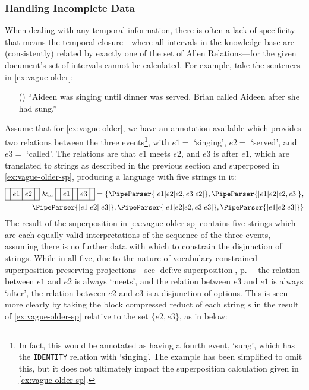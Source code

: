 \documentclass[a4paper,12pt,leqno,twoside]{article}
\newcommand{\vph}[1]{\vphantom{#1}}
\newcommand{\ebox}[1]{\fbox{$\vph{'(),}#1$}}
\newcommand{\nbBefore}[2]{\ebox{#1}\ebox{}\ebox{#2}}
\newcommand{\nbMeets}[2]{\ebox{#1}\ebox{#2}}
\newcommand{\nbAfter}[2]{\nbBefore{#2}{#1}}
\newcommand{\Meets}[2]{\ebox{}\nbMeets{#1}{#2}\ebox{}}
\newcommand{\After}[2]{\ebox{}\nbAfter{#1}{#2}\ebox{}}
\newcommand{\spvc}{~\&_{v\!c}~}
\newcommand{\EventString}[1]{%
	\renewcommand*{\do}[1]{\ebox{##1}}%
	\PipeParser{#1}%
}
\newcommand{\ipp}{(\refstepcounter{equation}\theequation)}
\begin{document}
\subsubsection{Handling Incomplete Data}\label{ssub:incomplete}
When dealing with any temporal information, there is often a lack of specificity that means the temporal closure---where all intervals in the knowledge base are (consistently) related by exactly one of the set of Allen Relations---for the given document's set of intervals cannot be calculated. For example, take the sentences in \cref{ex:vague-older}:
\begin{itemize}
	\item[\ipp\label{ex:vague-older}] ``Aideen was singing until dinner was served. Brian called Aideen after she had sung.''
\end{itemize}
Assume that for \cref{ex:vague-older}, we have an annotation available which provides two relations between the three events\footnote{In fact, this would be annotated as having a fourth event, `sung', which has the \texttt{IDENTITY} relation with `singing'. The example has been simplified to omit this, but it does not ultimately impact the superposition calculation given in \cref{ex:vague-older-sp}.}, with $e1 = $ `singing', $e2 = $ `served', and $e3 = $ `called'. The relations are that $e1$ meets $e2$, and $e3$ is after $e1$, which are translated to strings as described in the previous section and superposed in \cref{ex:vague-older-sp}, producing a language with five strings in it:
\begin{align}
	\Meets{e1}{e2} \spvc \After{e3}{e1} = \{\EventString{{}|e1|e2|e2,e3|e2|{}}, \EventString{{}|e1|e2|e2,e3|{}},\label{ex:vague-older-sp}\\
	\EventString{{}|e1|e2|{}|e3|{}}, \EventString{{}|e1|e2|e2,e3|e3|{}}, \EventString{{}|e1|e2|e3|{}}\}\notag
\end{align}
The result of the superposition in \cref{ex:vague-older-sp} contains five strings which are each equally valid interpretations of the sequence of the three events, assuming there is no further data with which to constrain the disjunction of strings. While in all five, due to the nature of vocabulary-constrained superposition preserving projections---see \cref{def:vc-superposition}, p. \pageref{def:vc-superposition}---the relation between $e1$ and $e2$ is always `meets', and the relation between $e3$ and $e1$ is always `after', the relation between $e2$ and $e3$ is a disjunction of options. This is seen more clearly by taking the block compressed reduct of each string $s$ in the result of \cref{ex:vague-older-sp} relative to the set $\{e2, e3\}$, as in  below:
\end{document}

